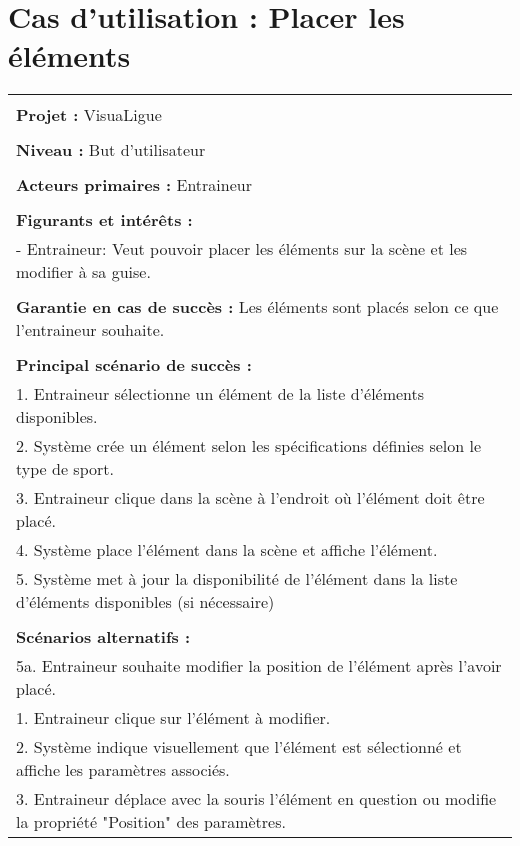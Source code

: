\section{Cas d'utilisation : Placer les éléments}
\begin{longtable}{|p{16cm}|}
	\hline
	\\
	\textbf{Projet :} VisuaLigue\\
	\\
	\textbf{Niveau :} But d'utilisateur\\
	\\
	\textbf{Acteurs primaires :} Entraineur\\
	\\
	\textbf{Figurants et intérêts :} \\
	- Entraineur: Veut pouvoir placer les éléments sur la scène et les modifier à sa guise.\\
	\\
	\textbf{Garantie en cas de succès :} Les éléments sont placés selon ce que l'entraineur souhaite.\\
	\\
	\textbf{Principal scénario de succès :}\\
	1. Entraineur sélectionne un élément de la liste d'éléments disponibles.\\
	2. Système crée un élément selon les spécifications définies selon le type de sport.\\
	3. Entraineur clique dans la scène à l'endroit où l'élément doit être placé.\\
	4. Système place l'élément dans la scène et affiche l'élément.\\
	5. Système met à jour la disponibilité de l'élément dans la liste d'éléments disponibles (si nécessaire)\\
	\\
	\textbf{Scénarios alternatifs :}\\
	5a. Entraineur souhaite modifier la position de l'élément après l'avoir placé.\\
	\hspace{0.5cm}1. Entraineur clique sur l'élément à modifier.\\
	\hspace{0.5cm}2. Système indique visuellement que l'élément est sélectionné et affiche les paramètres associés.\\
	\hspace{0.5cm}3. Entraineur déplace avec la souris l'élément en question ou modifie la propriété "Position" des paramètres.\\

\end{longtable}
